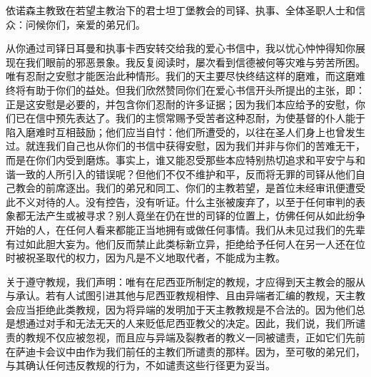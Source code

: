 \par

依诺森主教致在若望主教治下的君士坦丁堡教会的司铎、执事、全体圣职人士和信众：问候你们，亲爱的弟兄们。\par

从你通过司铎日耳曼和执事卡西安转交给我的爱心书信中，我以忧心忡忡得知你展现在我们眼前的邪恶景象。我反复阅读时，屡次看到信德被何等灾难与劳苦所困。唯有忍耐之安慰才能医治此种情形。我们的天主要尽快终结这样的磨难，而这磨难终将有助于你们的益处。但我们欣然赞同你们在爱心书信开头所提出的主张，即：正是这安慰是必要的，并包含你们忍耐的许多证据；因为我们本应给予的安慰，你们已在信中预先表达了。我们的主惯常赐予受苦者这种忍耐，为使基督的仆人能于陷入磨难时互相鼓励；他们应当自忖：他们所遭受的，以往在圣人们身上也曾发生过。就连我们自己也从你们的书信中获得安慰，因为我们并非与你们的苦难无干，而是在你们内受到磨炼。事实上，谁又能忍受那些本应特别热切追求和平安宁与和谐一致的人所引入的错误呢？但他们不仅不维护和平，反而将无罪的司铎从他们自己教会的前席逐出。我们的弟兄和同工、你们的主教若望，是首位未经审讯便遭受此不义对待的人。没有控告，没有听证。什么主张被废弃了，以至于任何审判的表象都无法产生或被寻求？别人竟坐在仍在世的司铎的位置上，仿佛任何从如此纷争开始的人，在任何人看来都能正当地拥有或做任何事情。我们从未见过我们的先辈有过如此胆大妄为。他们反而禁止此类标新立异，拒绝给予任何人在另一人还在位时被祝圣取代的权力，因为凡是不义地取代者，不能成为主教。\par

关于遵守教规，我们声明：唯有在尼西亚所制定的教规，才应得到天主教会的服从与承认。若有人试图引进其他与尼西亚教规相悖、且由异端者汇编的教规，天主教会应当拒绝此类教规，因为将异端的发明加于天主教教规是不合法的。因为他们总是想通过对手和无法无天的人来贬低尼西亚教父的决定。因此，我们说，我们所谴责的教规不仅应被忽视，而且应与异端及裂教者的教义一同被谴责，正如它们先前在萨迪卡会议中由作为我们前任的主教们所谴责的那样。因为，至可敬的弟兄们，与其确认任何违反教规的行为，不如谴责这些行径更为妥当。\par

